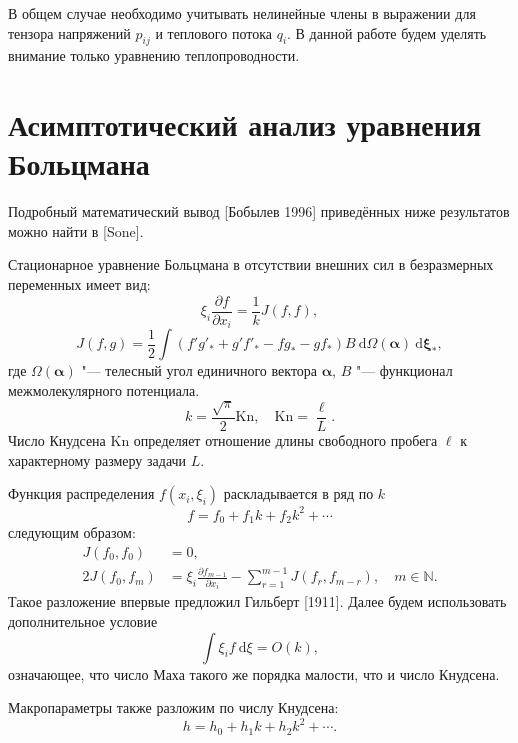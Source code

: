 \documentclass[english,russian,a4paper,12pt]{article}
\newcommand{\Kn}{\mathrm{Kn}}
\newcommand{\dd}{\:\mathrm{d}}
\newcommand{\pder}[2][]{\frac{\partial#1}{\partial#2}}
\begin{document}
В общем случае необходимо учитывать нелинейные члены в выражении для тензора напряжений \(p_{ij}\) и теплового потока \(q_i\).
В данной работе будем уделять внимание только уравнению теплопроводности.

\section{Асимптотический анализ уравнения Больцмана}
Подробный математический вывод [Бобылев 1996] приведённых ниже результатов можно найти в [Sone].

Стационарное уравнение Больцмана в отсутствии внешних сил в безразмерных переменных имеет вид:
\begin{equation}\label{eq:Boltzmann}
	\xi_i\pder[f]{x_i} = \frac1k J(f,f),
\end{equation}
\begin{equation}\label{eq:integral}
	J(f,g) = \frac12 \int(f'g'_*+g'f'_*-fg_*-gf_*)B\dd\Omega(\boldsymbol\alpha)\dd \boldsymbol\xi_*,
\end{equation}
где \(\Omega(\boldsymbol{\alpha})\) "--- телесный угол единичного вектора \(\boldsymbol\alpha\),
\(B\) "--- функционал межмолекулярного потенциала.
\[ k = \frac{\sqrt\pi}2\Kn, \quad \Kn = \frac{\ell}L. \]
Число Кнудсена \(\Kn\) определяет отношение длины свободного пробега \(\ell\) к характерному размеру задачи \(L\).

Функция распределения \(f(x_i,\xi_i)\) раскладывается в ряд по \(k\)
\[ f = f_0 + f_1k + f_2k^2 + \cdots \]
следующим образом:
\begin{align*}
	J(f_0,f_0) &= 0, \\
	2J(f_0,f_m) &= \xi_i\pder[f_{m-1}]{x_i} - \sum\limits_{r=1}^{m-1}J(f_r,f_{m-r}), \quad m \in \mathbb{N}.
\end{align*}
Такое разложение впервые предложил Гильберт [1911]. Далее будем использовать дополнительное условие
\[ \int\xi_if\dd\xi = O(k), \]
означающее, что число Маха такого же порядка малости, что и число Кнудсена.

Макропараметры также разложим по числу Кнудсена:
\[ h = h_0 + h_1k + h_2k^2 + \cdots. \]
\end{document}
